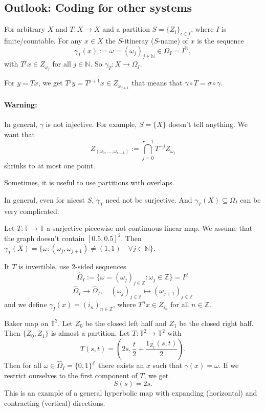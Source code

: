 \documentclass{article}
\newcommand*{\N}{\mathbb{N}}
\newcommand*{\Z}{\mathbb{Z}}
\newcommand*{\T}{\mathbb{T}}
\newcommand*{\half}[1]{\frac{#1}{2}}
\newcommand*{\og}{\omega}
\newcommand*{\Og}{\Omega}
\begin{document}
\subsection{Outlook: Coding for other systems}

\begin{defin}
    For arbitrary $X$ and $T:X\to X$ and a partition $S=\{Z_i\}_{i\in I}$, where $I$ is finite/countable. For any $x\in X$ the $S$-itineray ($S$-name) of $x$ is the sequence
    $$\gamma_T(x):=\omega=(\omega_j)_{j\in\N}\in\Omega_I=I^\N,$$
    with $T^jx \in Z_{\omega_j}$ for all $j\in\N$. So $\gamma_T:X\to \Omega_I$.
\end{defin}

For $y = Tx$, we get $T^jy=T^{j+1}x \in Z_{\omega_{j+1}}$ that means that $\gamma \circ T = \sigma \circ \gamma$.

\paragraph{Warning:}
In general, $\gamma$ is not injective. For example, $S = \{X\}$ doesn't tell anything. We want that
$$Z_{(\omega_0,\dots,\omega_{r-1})}:=\bigcap_{j=0}^{r-1}T^{-j}Z_{\omega_j}$$
shrinks to at most one point.

\begin{rem}
    Sometimes, it is useful to use partitions with overlaps.
\end{rem}

\begin{rem}
    In general, even for nicest $S$, $\gamma_T$ need not be surjective. And $\gamma_T(X) \subseteq \Omega_I$ can be very complicated.
\end{rem}

\begin{exam}
    Let $T:\T\to\T$ a surjective piecewise not continuous linear map. We assume that the graph doesn't contain $[0.5,0.5]^2$. Then $\gamma_T(X)=\{\omega: (\omega_j,\omega_{j+1})\neq(1,1)\quad  \forall j\in\N\}$.
\end{exam}

It $T$ is invertible, use $2$-sided sequences
$$\hat\Omega_I:=\{\og=(\og_j)_{j\in\Z}:\og_j\in\Z\}=I^\Z$$
$$\hat\Omega_I\to\hat\Omega_I, \quad (\omega_j)_{j\in\Z}\mapsto (\og_{j+1})_{j\in\Z}$$
and we define $\gamma_I(x)=(i_n)_{n\in\Z}$, where $T^nx\in Z_{i_n}$ for all $n\in\Z$.

\begin{exam}
    Baker map on $\T^2$. Let $Z_0$ be the closed left half and $Z_1$ be the closed right half. Then $\{Z_0, Z_1\}$ is almost a partition. Let $T:\T^2\to\T^2$ with
    $$T(s,t) = \left(2s,\half t+\half{1_{Z_1}(s,t)}\right).$$
    Then for all $\og\in\hat\Og_I=\{0,1\}^\Z$ there exists an $x$ such that $\gamma(x)=\og$. If we restrict ourselves to the first component of $T$, we get
    $$S(s) = 2s.$$
    This is an example of a general hyperbolic map with expanding (horizontal) and contracting (vertical) directions.
\end{exam}
\end{document}
